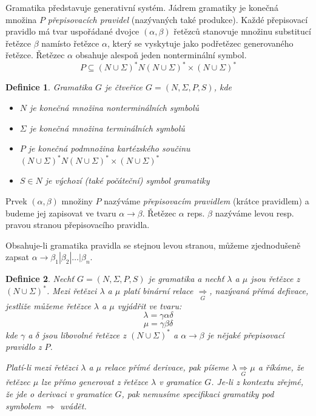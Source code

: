 \documentclass[a4paper, 11pt]{report}
\newtheorem{mydef}{Definice}[chapter]
\begin{document}
Gramatika představuje generativní systém. Jádrem gramatiky je konečná množina $P$ \emph{přepisovacích pravidel} (nazývaných také produkce). Každé přepisovací pravidlo má tvar uspořádané dvojce $(\alpha, \beta)$ řetězců stanovuje množinu substitucí řetězce $\beta$ namísto řetězce $\alpha$, který se vyskytuje jako podřetězec generovaného řetězce. Řetězec $\alpha$ obsahuje alespoň jeden nonterminální symbol.
$$P \subseteq (N \cup \Sigma)^* N (N \cup \Sigma)^* \times (N \cup \Sigma)^*$$

\begin{mydef}
Gramatika $G$ je čtveřice $G = (N, \Sigma, P, S)$, kde
\begin{itemize}
	\item $N$ je konečná množina nonterminálních symbolů
	\item $\Sigma$ je konečná množina terminálních symbolů
	\item $P$ je konečná podmnožina kartézského součinu $(N \cup \Sigma)^* N (N \cup \Sigma)^* \times (N \cup \Sigma)^*$
	\item $S \in N$ je výchozí (také počáteční) symbol gramatiky
\end{itemize}
\end{mydef}

Prvek $(\alpha, \beta)$ množiny $P$ nazýváme \emph{přepisovacím pravidlem} (krátce pravidlem) a budeme jej zapisovat ve tvaru $\alpha \to \beta$. Řetězec $\alpha$ reps. $\beta$ nazýváme levou resp. pravou stranou přepisovacího pravidla.

Obsahuje-li gramatika pravidla se stejnou levou stranou, můžeme zjednodušeně zapsat $\alpha \to \beta_1 | \beta_2 | \dots | \beta_n$.

\begin{mydef}
Nechť $G = (N, \Sigma, P, S)$ je gramatika a nechť $\lambda$ a $\mu$ jsou řetězce z $(N \cup \Sigma)^*$. Mezi řetězci $\lambda$ a $\mu$ platí binární relace $\underset{G}{\Rightarrow}$, nazývaná \emph{přímá defivace}, jestliže můžeme řetězce $\lambda$ a $\mu$ vyjádřit ve tvaru:
$$\lambda = \gamma \alpha \delta$$
$$\mu = \gamma \beta \delta$$
kde $\gamma$ a $\delta$ jsou libovolné řetězce z $(N \cup \Sigma)^*$ a $\alpha \to \beta$ je nějaké přepisovací pravidlo z $P$.

Platí-li mezi řetězci $\lambda$ a $\mu$ relace přímé derivace, pak píšeme $\lambda \underset{G}{\Rightarrow} \mu$ a říkáme, že řetězec $\mu$ lze přímo generovat z řetězce $\lambda$ v gramatice $G$. Je-li z kontextu zřejmé, že jde o derivaci v gramatice $G$, pak nemusíme specifikaci gramatiky pod symbolem $\Rightarrow$ uvádět.
\end{mydef}
\end{document}

